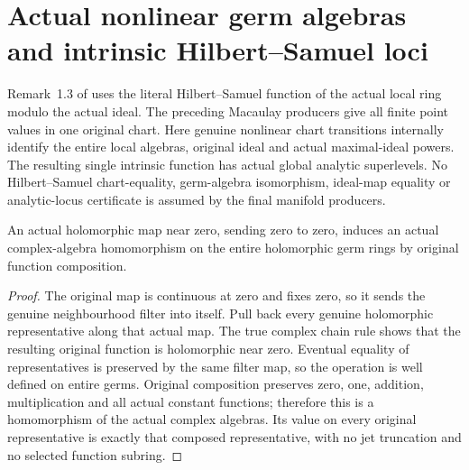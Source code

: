 \section{Actual nonlinear germ algebras and intrinsic Hilbert--Samuel loci}
\label{sec:hironaka-holomorphic-jet-chart-invariance}

Remark~1.3 of \cite{bierstone-milman97-invent-math} uses the literal
Hilbert--Samuel function of the actual local ring modulo the actual ideal.
The preceding Macaulay producers give all finite point values in one original
chart. Here genuine nonlinear chart transitions internally identify the
entire local algebras, original ideal and actual maximal-ideal powers.
The resulting single intrinsic function has actual global analytic superlevels.
No Hilbert--Samuel chart-equality, germ-algebra isomorphism, ideal-map equality
or analytic-locus certificate is assumed by the final manifold producers.

\begin{lemma}
\label{hir:actual-nonlinear-holomorphic-germ-algebra}
\leanok
{}
An actual holomorphic map near zero, sending zero to zero, induces an actual
complex-algebra homomorphism on the entire holomorphic germ rings by original
function composition.
\end{lemma}
\begin{proof}
The original map is continuous at zero and fixes zero, so it sends the genuine
neighbourhood filter into itself. Pull back every genuine holomorphic
representative along that actual map. The true complex chain rule shows that
the resulting original function is holomorphic near zero. Eventual equality
of representatives is preserved by the same filter map, so the operation
is well defined on entire germs. Original composition preserves zero, one,
addition, multiplication and all actual constant functions; therefore this
is a homomorphism of the actual complex algebras. Its value on every original
representative is exactly that composed representative, with no jet
truncation and no selected function subring.
\end{proof}

